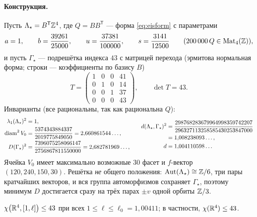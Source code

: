 \paragraph{Конструкция.}
Пусть $\Lambda_\star=B^{\mathsf T}\mathbb{Z}^4$, где $Q=BB^{\mathsf T}$ --- форма
\eqref{eq:eisform} с параметрами
\begin{equation}\label{eq:gram43}
a=1,\qquad b=\frac{39261}{25000},\qquad u=\frac{37381}{100000},\qquad
s=\frac{3141}{12500}
\qquad(200\,000\,Q\in\mathrm{Mat}_4(\mathbb{Z})),
\end{equation}
и пусть $\Gamma_\star$ --- подрешётка индекса $43$ с матрицей перехода
(эрмитова нормальная форма; строки --- коэффициенты по базису $B$)
\begin{equation}\label{eq:hnf43}
T=\begin{pmatrix}1&0&0&41\\0&1&0&14\\0&0&1&37\\0&0&0&43\end{pmatrix},
\qquad\det T=43 .
\end{equation}
Инварианты (все рациональны, так как рациональна $Q$):
\[
\begin{aligned}
\lambda_1(\Lambda_\star)^2&=1,\\
\operatorname{diam}^2V_0&=\frac{5374343884337}{2019775849050}
  =2{,}660861544\ldots,\\
D(\Gamma_\star)^2&=\frac{7396075258066147}{2756867811550000}
  =2{,}682781969\ldots,
\end{aligned}
\qquad
\begin{aligned}
d(\Lambda_\star,\Gamma_\star)^2
&=\frac{298768283679964998359742207}{296327113258585430253847000}\\
&=1{,}008238093\ldots,\\
d&=1{,}004110598\ldots
\end{aligned}
\]
Ячейка $V_0$ имеет максимально возможные $30$ фасет и $f$-вектор
$(120,240,150,30)$. Решётка \emph{не} общего положения:
$\mathrm{Aut}(\Lambda_\star)\cong\mathbb{Z}/6$, три пары кратчайших векторов, и вся
группа автоморфизмов сохраняет $\Gamma_\star$, поэтому минимум $D$
достигается сразу на трёх парах $\pm v$ одной орбиты $\mathbb{Z}/3$.

\begin{keybox}
\begin{theorem}\label{thm:main43}
$\chi\bigl(\mathbb{R}^4,[1,\ell]\bigr)\le43$ при всех $1\le\ell\le\ell_0=1{,}00411$;
в частности, $\chi(\mathbb{R}^4)\le43$.
\end{theorem}
\end{keybox}


